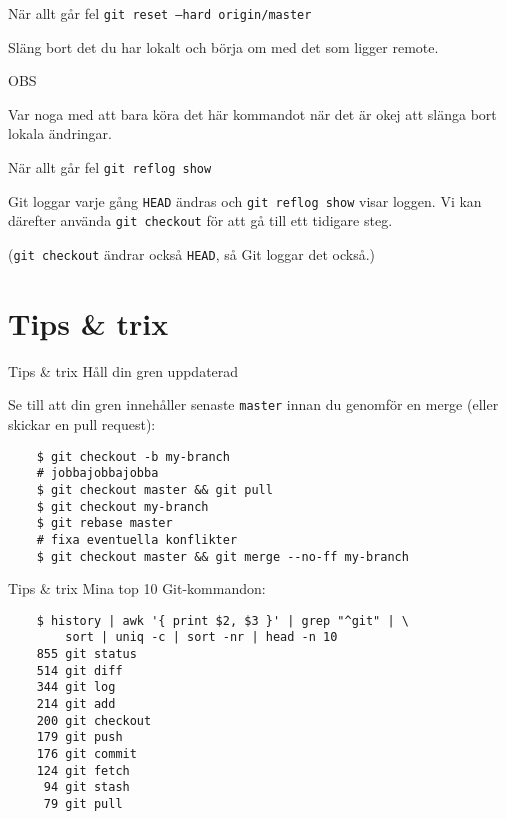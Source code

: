 \documentclass[11pt,xetex]{beamer}
\begin{document}
\begin{frame}{När allt går fel}
  \Large
  \texttt{git reset --hard origin/master}

  \normalsize
  Släng bort det du har lokalt och börja om med det som ligger remote.
  \pause

  \vspace{1em}
  \alert{OBS}

  \normalsize
  Var noga med att bara köra det här kommandot när det är okej att slänga bort
  lokala ändringar.
\end{frame}

\begin{frame}{När allt går fel}
  \Large
  \texttt{git reflog show}

  \normalsize
  Git loggar varje gång \texttt{HEAD} ändras och
  \texttt{git reflog show} visar loggen. Vi kan därefter använda
  \texttt{git checkout} för att gå till ett tidigare steg.

  \scriptsize
  (\texttt{git checkout} ändrar också \texttt{HEAD}, så
  Git loggar det också.)
\end{frame}


\section*{Tips \& trix}

\begin{frame}[fragile]{Tips \& trix}
  \Large
  Håll din gren uppdaterad

  \normalsize
  Se till att din gren innehåller senaste \texttt{master} innan du
  genomför en merge (eller skickar en pull request):

  \begin{verbatim}
    $ git checkout -b my-branch
    # jobbajobbajobba
    $ git checkout master && git pull
    $ git checkout my-branch
    $ git rebase master
    # fixa eventuella konflikter
    $ git checkout master && git merge --no-ff my-branch
  \end{verbatim}
\end{frame}

\begin{frame}[fragile]{Tips \& trix}
  \Large
  Mina top 10 Git-kommandon:

  \begin{verbatim}
    $ history | awk '{ print $2, $3 }' | grep "^git" | \
        sort | uniq -c | sort -nr | head -n 10
    855 git status
    514 git diff
    344 git log
    214 git add
    200 git checkout
    179 git push
    176 git commit
    124 git fetch
     94 git stash
     79 git pull
  \end{verbatim}
\end{frame}
\end{document}
